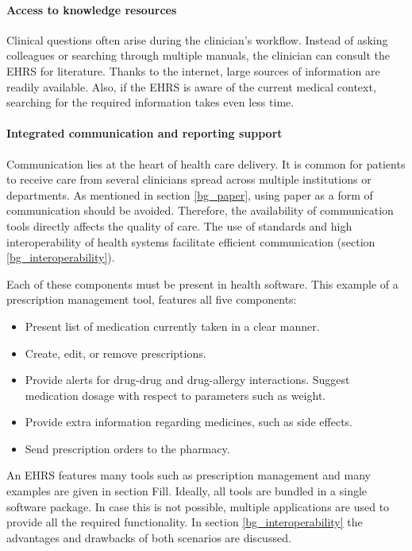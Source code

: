     \paragraph{Access to knowledge resources} Clinical questions often arise during the clinician's workflow. Instead of asking colleagues or searching through multiple manuals, the clinician can consult the EHRS for literature. Thanks to the internet, large sources of information are readily available. Also, if the EHRS is aware of the current medical context, searching for the required information takes even less time. 

    \paragraph{Integrated communication and reporting support} Communication lies at the heart of health care delivery. It is common for patients to receive care from several clinicians spread across multiple institutions or departments. As mentioned in section \ref{bg_paper}, using paper as a form of communication should be avoided. Therefore, the availability of communication tools directly affects the quality of care. The use of standards and high interoperability of health systems facilitate efficient communication (section \ref{bg_interoperability}).\bigskip %

    \noindent Each of these components must be present in health software. This example of a prescription management tool, features all five components:
    \begin{itemize}
        \item Present list of medication currently taken in a clear manner.
        \item Create, edit, or remove prescriptions.
        \item Provide alerts for drug-drug and drug-allergy interactions. Suggest medication dosage with respect to parameters such as weight.
        \item Provide extra information regarding medicines, such as side effects.
        \item Send prescription orders to the pharmacy.
    \end{itemize}

    \noindent An EHRS features many tools such as prescription management and many examples are given in section Fill. Ideally, all tools are bundled in a single software package. In case this is not possible, multiple applications are used to provide all the required functionality. In section \ref{bg_interoperability} the advantages and drawbacks of both scenarios are discussed. %

